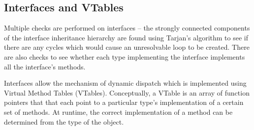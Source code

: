 \documentclass{article}
\begin{document}
\subsection{Interfaces and VTables}
Multiple checks are performed on interfaces -- the strongly connected components of the interface inheritance hierarchy are found using Tarjan's algorithm to see if there are any cycles which would cause an unresolvable loop to be created. There are also checks to see whether each type implementing the interface implements all the interface's methods.

Interfaces allow the mechanism of dynamic dispatch which is implemented using Virtual Method Tables (VTables). Conceptually, a VTable is an array of function pointers that that each point to a particular type's implementation of a certain set of methods. At runtime, the correct implementation of a method can be determined from the type of the object.
\end{document}
